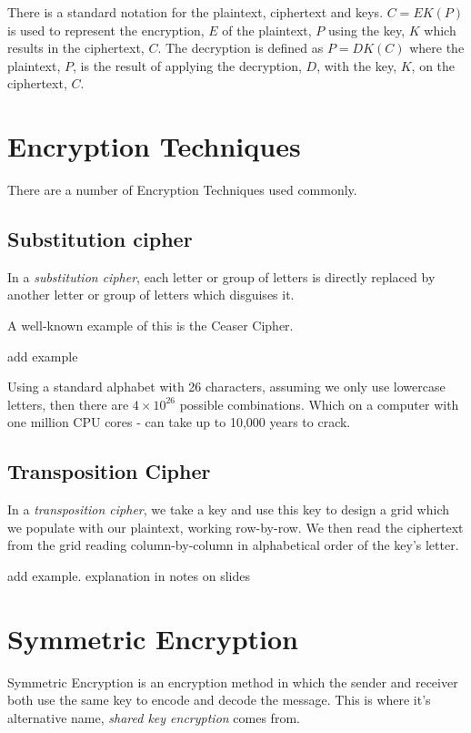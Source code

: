 There is a standard notation for the plaintext, ciphertext and keys. $C=EK(P)$ is used to represent the encryption, $E$ of the plaintext, $P$ using the key, $K$ which results in the ciphertext, $C$. The decryption is defined as $P=DK(C)$ where the plaintext, $P$, is the result of applying the decryption, $D$, with the key, $K$, on the ciphertext, $C$. 

\section{Encryption Techniques}
There are a number of Encryption Techniques used commonly.

\subsection{Substitution cipher}
In a \textit{substitution cipher}, each letter or group of letters is directly replaced by another letter or group of letters which disguises it. 

A well-known example of this is the Ceaser Cipher. 

\begin{todo}
add example
\end{todo}

Using a standard alphabet with 26 characters, assuming we only use lowercase letters, then there are $4 \times 10^{26}$ possible combinations. Which on a computer with one million CPU cores - can take up to 10,000 years to crack.

\subsection{Transposition Cipher}
In a \textit{transposition cipher}, we take a key and use this key to design a grid which we populate with our plaintext, working row-by-row. We then read the ciphertext from the grid reading column-by-column in alphabetical order of the key's letter.

\begin{todo}
add example. explanation in notes on slides
\end{todo}

\section{Symmetric Encryption}
Symmetric Encryption is an encryption method in which the sender and receiver both use the same key to encode and decode the message. This is where it's alternative name, \textit{shared key encryption} comes from. 

